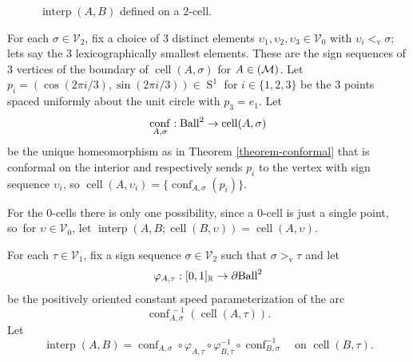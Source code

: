 \documentclass[11pt]{article}
\numberwithin{equation}{section}
\theoremstyle{remark}
\let\mc\mathcal
\let\mb\mathbb
\let\phi\varphi
\newcommand{\vv}{{\vvv}}
\DeclareMathOperator{\vvv}{v}
\DeclareMathOperator{\sphere}{S}
\DeclareMathOperator{\cell}{cell}
\DeclareMathOperator{\conf}{conf}
\newcommand{\Ball}{\text{\rm Ball}}
\DeclareMathOperator{\interp}{interp}
\begin{document}
\begin{figure}[htb]
\begin{center}
\end{center}

\caption{$\interp(A,B)$ defined on a $2$-cell.}
\label{figure-interp}

\end{figure}

For each $\sigma \in \mc{V}_{2}$, fix a choice of $3$ distinct elements $\upsilon_1,\upsilon_2,\upsilon_3 \in \mc{V}_{0}$ with $\upsilon_i <_\vv \sigma$; lets say the $3$ lexicographically smallest elements. These are the sign sequences of $3$ vertices of the boundary of $\cell(A,\sigma)$ for $A \in \real(\mc{M})$.
Let $p_i = (\cos (2\pi i/3), \sin (2\pi i/3)) \in \sphere^1$ for $i \in \{1,2,3\}$ be the $3$ points spaced uniformly about the unit circle with $p_3 = e_1$.
Let
\[ \conf_{A,\sigma}: \Ball^2 \to \cell(A,\sigma) \]
be the unique homeomorphism as in Theorem \ref{theorem-conformal} that is conformal on the interior and respectively sends $p_i$ to the vertex with sign sequence $\upsilon_i$, so $\cell(A,\upsilon_i) = \{\conf_{A,\sigma}(p_i)\}$.

For the 0-cells there is only one possibility, since a 0-cell is just a single point, so~for $\upsilon \in \mc{V}_{0}$,
let $\interp(A,B;\cell(B,\upsilon)) = \cell(A,\upsilon)$.

For each $\tau \in \mc{V}_{1}$, fix a sign sequence $\sigma \in \mc{V}_{2}$ such that $\sigma >_\vv \tau$ and let\vspace*{-3pt}
\[\phi_{A,\tau} : [0,1]_\mb{R} \to \partial{}\Ball^2\] be the positively oriented constant speed parameterization of the arc\vspace*{-3pt}
\[
\conf_{A,\sigma}^{\,-1}(\cell(A,\tau)).
\]
Let\vspace*{-5pt}
\[ \interp(A,B) = \conf_{A,\sigma}^{\phantom1} \circ \phi_{A,\tau}^{\phantom1} \circ \phi_{B,\tau}^{-1} \circ \conf_{B,\sigma}^{-1} \quad
\text{on } \cell(B,\tau).\]
\end{document}
